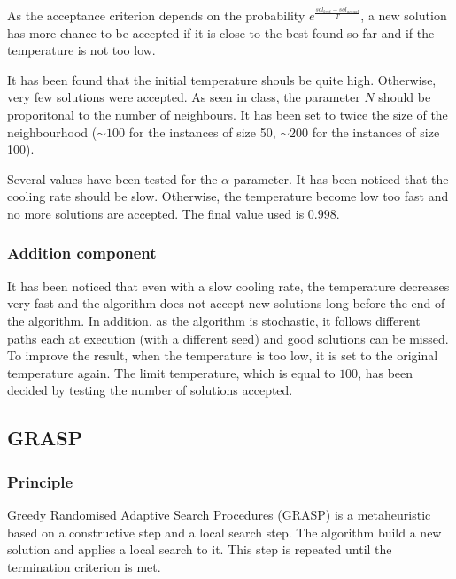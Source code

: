 \documentclass{article}
\begin{document}
As the acceptance criterion depends on the probability $e^{ \frac{sol_{best}-sol_{actual}}{T}}$, a new solution has more chance to be accepted if it is close to the best found so far and if the temperature is not too low. \newline

It has been found that the initial temperature shouls be quite high.
Otherwise, very few solutions were accepted.
As seen in class, the parameter $N$ should be proporitonal to the number of neighbours.
It has been set to twice the size of the neighbourhood ($\sim100$ for the instances of size 50, $\sim200$ for the instances of size 100).\newline

Several values have been tested for the $\alpha$ parameter.
It has been noticed that the cooling rate should be slow.
Otherwise, the temperature become low too fast and no more solutions are accepted.
The final value used is $0.998$.

\subsubsection{Addition component}

It has been noticed that even with a slow cooling rate, the temperature decreases very fast and the algorithm does not accept new solutions long before the end of the algorithm.
In addition, as the algorithm is stochastic, it follows different paths each at execution (with a different seed) and good solutions can be missed.
To improve the result, when the temperature is too low, it is set to the original temperature again.
The limit temperature, which is equal to $100$, has been decided by testing the number of solutions accepted.

\subsection{GRASP}

\subsubsection{Principle}

Greedy Randomised Adaptive Search Procedures (GRASP) is a metaheuristic based on a constructive step and a local search step.
The algorithm build a new solution and applies a local search to it.
This step is repeated until the termination criterion is met.\newline
\end{document}
